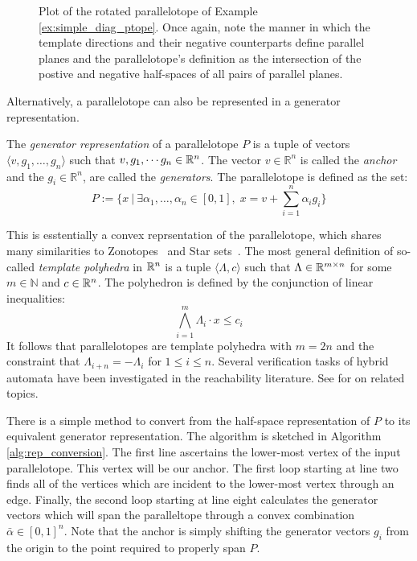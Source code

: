\begin{example}
\begin{figure}[h!]
\begin{tikzpicture}
    \end{tikzpicture}
    \caption{Plot of the rotated parallelotope of Example \ref{ex:simple_diag_ptope}. Once again, note the manner in which the template directions and their negative counterparts define parallel planes and the parallelotope's definition as the intersection of the postive and negative half-spaces of all pairs of parallel planes.}
    \label{fig:diagonal_ptope}
  \end{figure}
\end{example}


\noindent Alternatively, a parallelotope can also be represented in a generator representation.
%
\begin{definition}
\label{def:generator_def}
The \emph{generator representation} of a parallelotope $P$ is a tuple of vectors $\langle v, g_1, \ldots, g_n\rangle$ such that $v,g_1, \cdots g_n \in \reals^n$. The vector  $v \in \mathbb{R}^n$ is called the \emph{anchor} and the $g_i \in \mathbb{R}^n$, are called the \emph{generators}. The parallelotope is defined as the set:
$$
P := \{ x ~|~ \exists \alpha_1, \ldots, \alpha_n \in [0,1], \; x = v + \sum_{i=1}^n \alpha_i g_i \}
$$
\end{definition}
%
\begin{remark}
  \noindent This is esstentially a convex reprsentation of the parallelotope, which shares many similarities to Zonotopes~\cite{girard2005reachability,althoff2010computing} and Star sets~\cite{duggirala2016parsimonious}.
  The most general definition of so-called \emph{template polyhedra} in $\reals^n$ is a tuple $\langle \Lambda, c \rangle$ such that $\Lambda \in \reals^{m \times n}$ for some $m \in \mathbb{N}$ and $c \in \reals^n$. The polyhedron is defined by the conjunction of linear
 inequalities:
%
 \begin{equation}
  \bigwedge_{i=1}^m \Lambda_i \cdot x \leq c_i
 \end{equation}
It follows that parallelotopes are template polyhedra with $m=2n$ and the constraint that $\Lambda_{i+n} = -\Lambda_{i}$ for $1 \leq i \leq n$. Several verification tasks of hybrid automata have been investigated in the reachability literature. See \cite{dang2011template, gronski2019template, sankaranarayanan2008symbolic} for on related topics.
\end{remark}
%
There is a simple method to convert from the half-space representation of $P$ to its equivalent generator representation. The algorithm is sketched in Algorithm \ref{alg:rep_conversion}.
%
The first line ascertains the lower-most vertex of the input parallelotope. This vertex will be our anchor. The first loop starting at line two finds all of the vertices which are incident to the lower-most vertex through an edge. Finally, the second loop starting at line eight calculates the generator vectors which will span the paralleltope through a convex combination $\bar{\alpha} \in [0,1]^n$. Note that the anchor is simply shifting the  generator vectors $g_i$ from the origin to the point required to properly span $P$.

